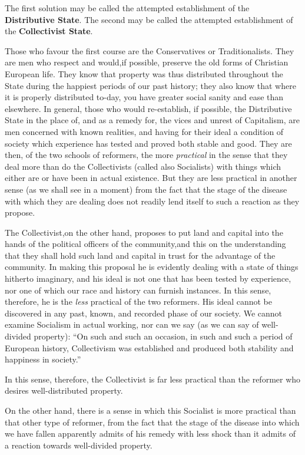 \documentclass{book}
\begin{document}
The first solution may be called the attempted establishment of the \textbf{Distributive State}. The second may be called the attempted establishment of the \textbf{Collectivist State}.

Those who favour the first course are the Conservatives or Traditionalists. They are men who respect and would,if possible, preserve the old forms of Christian European life. They know that property was thus distributed throughout the State during the happiest periods of our past history; they also know that where it is properly distributed to-day, you have greater social sanity and ease than elsewhere. In general, those who would re-establish, if possible, the Distributive State in the place of, and as a remedy for, the vices and unrest of Capitalism, are men concerned with known realities, and having for their ideal a condition of society which experience has tested and proved both stable and good. They are then, of the two schools of reformers, the more \emph{practical} in the sense that they deal more than do the Collectivists (called also Socialists) with things which either are or have been in actual existence. But they are less practical in another sense (as we shall see in a moment) from the fact that the stage of the disease with which they are dealing does not readily lend itself to such a reaction as they propose.

The Collectivist,on the other hand, proposes to put land and capital into the hands of the political officers of the community,and this on the understanding that they shall hold such land and capital in trust for the advantage of the community. In making this proposal he is evidently dealing with a state of things hitherto imaginary, and his ideal is not one that has been tested by experience, nor one of which our race and history can furnish instances. In this sense, therefore, he is the \emph{less} practical of the two reformers. His ideal cannot be discovered in any past, known, and recorded phase of our society. We cannot examine Socialism in actual working, nor can we say (as we can say of well-divided property): “On such and such an occasion, in such and such a period of European history, Collectivism was established and produced both stability and happiness in society.”

In this sense, therefore, the Collectivist is far less practical than the reformer who desires well-distributed property.

On the other hand, there is a sense in which this Socialist is more practical than that other type of reformer, from the fact that the stage of the disease into which we have fallen apparently admits of his remedy with less shock than it admits of a reaction towards well-divided property.
\end{document}

